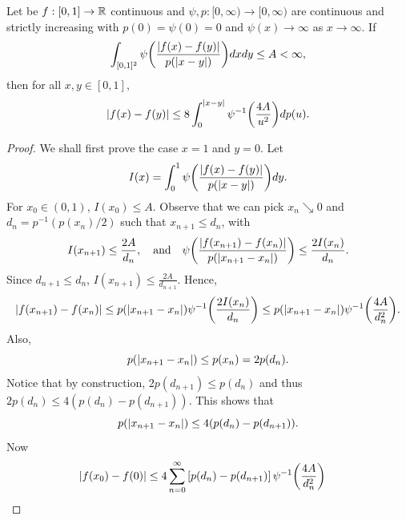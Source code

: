 \begin{theorem}
    Let be $f:[0,1]\to\mathbb{R}$ continuous and $\psi,p:[0,\infty)\to[0,\infty)$ 
    are continuous and strictly increasing with $p(0) = \psi(0) = 0$ and 
    $\psi(x)\to\infty$ as $x\to\infty$. If 
    \begin{equation*}
        \int_{[0,1]^2}\psi\pth{\frac{\abs{f(x)-f(y)}}{p(\abs{x-y})}}dxdy \leq A < \infty, 
    \end{equation*}
    then for all $x,y\in [0,1]$, 
    \begin{equation*}
        \abs{f(x)-f(y)}\leq 8\int_0^{\abs{x-y}}\psi^{-1}\pth{\frac{4A}{u^2}}dp(u). 
    \end{equation*}
\end{theorem}
\begin{proof}
    We shall first prove the case $x = 1$ and $y = 0$. 
    Let 
    \begin{equation*}
        I(x) = \int_0^1 \psi\pth{\frac{\abs{f(x)-f(y)}}{p(\abs{x-y})}}dy. 
    \end{equation*}
    For $x_0\in (0,1)$, $I(x_0)\leq A$. Observe that we can pick $x_n\searrow 0$ 
    and $d_n = p^{-1}(p(x_n)/2)$ such that $x_{n+1}\leq d_n$, with 
    \begin{equation*}
        I(x_{n+1}) \leq \frac{2A}{d_n}, \quad\text{and}\quad 
        \psi\pth{\frac{\abs{f(x_{n+1})-f(x_n)}}{p(\abs{x_{n+1}-x_n})}}\leq \frac{2I(x_n)}{d_n}. 
    \end{equation*} 
    Since $d_{n+1}\leq d_n$, $I(x_{n+1})\leq \frac{2A}{d_{n+1}}$. 
    Hence, 
    \begin{equation*}
        \abs{f(x_{n+1})-f(x_{n})}\leq p(\abs{x_{n+1}-x_n})\psi^{-1}\pth{\frac{2I(x_n)}{d_n}} 
        \leq p(\abs{x_{n+1}-x_n})\psi^{-1}\pth{\frac{4A}{d_n^2}}.  
    \end{equation*} 
    Also, 
    \begin{equation*}
        p(\left\lvert {x_{n+1}-x_n} \right\rvert) \leq p(x_n) = 2p(d_n). 
    \end{equation*}
    Notice that by construction, $2p(d_{n+1})\leq p(d_n)$ and 
    thus $2p(d_n)\leq 4(p(d_{n})-p(d_{n+1}))$. This shows that   
    \begin{equation*}
        p(\left\lvert {x_{n+1}-x_n} \right\rvert)\leq 4(p(d_{n})-p(d_{n+1})). 
    \end{equation*}
    Now 
    \begin{equation*}
        \begin{split}
            \abs{f(x_0)-f(0)}&\leq 4\sum_{n=0}^\infty \sbrc{p(d_{n})-p(d_{n+1})}\psi^{-1}\pth{\frac{4A}{d_n^2}} 

\end{split}
\end{equation*}
\end{proof}
